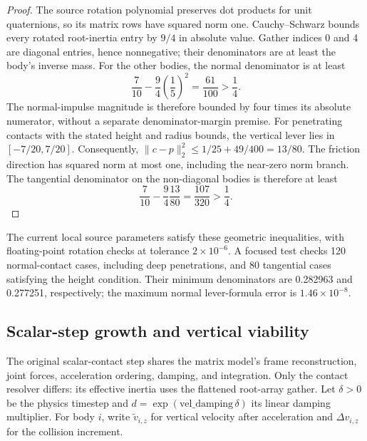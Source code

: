 \begin{proof}
The source rotation polynomial preserves dot products for unit quaternions, so its matrix rows have squared norm one.
Cauchy--Schwarz bounds every rotated root-inertia entry by $9/4$ in absolute value.
Gather indices 0 and 4 are diagonal entries, hence nonnegative; their denominators are at least the body's inverse mass.
For the other bodies, the normal denominator is at least
\begin{equation}
 \frac{7}{10}-\frac94\left(\frac15\right)^2=\frac{61}{100}>\frac14.
\end{equation}
The normal-impulse magnitude is therefore bounded by four times its absolute numerator, without a separate denominator-margin premise.
For penetrating contacts with the stated height and radius bounds, the vertical lever lies in $[-7/20,7/20]$.
Consequently, $\|c-p\|_2^2\le1/25+49/400=13/80$.
The friction direction has squared norm at most one, including the near-zero norm branch.
The tangential denominator on the non-diagonal bodies is therefore at least
\begin{equation}
 \frac{7}{10}-\frac94\frac{13}{80}=\frac{107}{320}>\frac14.
\end{equation}
\end{proof}

The current local source parameters satisfy these geometric inequalities, with floating-point rotation checks at tolerance $2\times10^{-6}$.
A focused test checks 120 normal-contact cases, including deep penetrations, and 80 tangential cases satisfying the height condition.
Their minimum denominators are 0.282963 and 0.277251, respectively; the maximum normal lever-formula error is $1.46\times10^{-8}$.

\subsection{Scalar-step growth and vertical viability}
\label{app:scalar_step}

The original scalar-contact step shares the matrix model's frame reconstruction, joint forces, acceleration ordering, damping, and integration.
Only the contact resolver differs: its effective inertia uses the flattened root-array gather.
Let $\delta>0$ be the physics timestep and $d=\exp(\mathrm{vel\_damping}\,\delta)$ its linear damping multiplier.
For body $i$, write $\widetilde v_{i,z}$ for vertical velocity after acceleration and $\Delta v_{i,z}$ for the collision increment.

